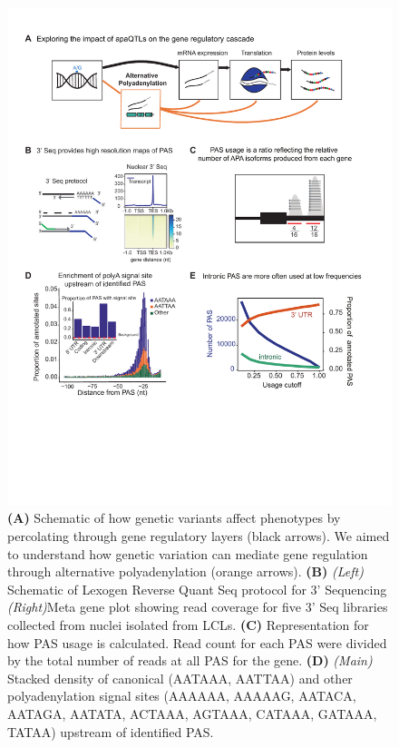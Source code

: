\begin{figure}
\centering
\includegraphics[width=5in]{img/ch02/figure1.pdf}
\caption[3' Sequencing of nuclei reliably captures alternative polyadenylation]{\small {\bf (A)} Schematic of how genetic variants affect phenotypes by percolating through gene regulatory layers (black arrows). We aimed to understand how genetic variation can mediate gene regulation through alternative polyadenylation (orange arrows). {\bf (B)} {\it (Left)} Schematic of Lexogen Reverse Quant Seq protocol for 3' Sequencing \citep{moll_quantseq_2014} {\it (Right)}Meta gene plot showing read coverage for five 3' Seq libraries collected from nuclei isolated from LCLs. {\bf (C)} Representation for how PAS usage is calculated. Read count for each PAS were divided by the total number of reads at all PAS for the gene. {\bf (D)} {\it (Main)} Stacked density of canonical (AATAAA, AATTAA) and other polyadenylation signal sites (AAAAAA, AAAAAG, AATACA, AATAGA, AATATA, ACTAAA, AGTAAA, CATAAA, GATAAA, TATAA) upstream of identified PAS.} 
\label{fig:3prime4APA}
\end{figure}



